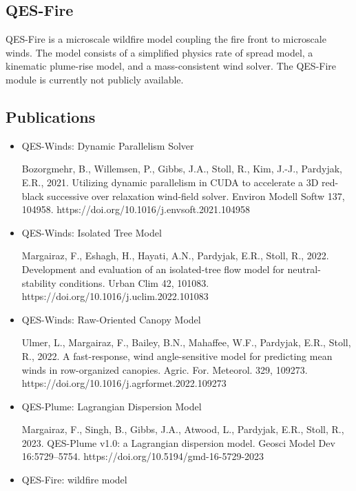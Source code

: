\subsection{QES-Fire}

QES-Fire is a microscale wildfire model coupling the fire front to microscale winds. The model consists of a simplified physics rate of spread model, a kinematic plume-rise model, and a mass-consistent wind solver. The QES-Fire module is currently not publicly available.


\subsection{Publications}

\begin{itemize}

\item QES-Winds: Dynamic Parallelism Solver

Bozorgmehr, B., Willemsen, P., Gibbs, J.A., Stoll, R., Kim, J.-J., Pardyjak, E.R., 2021. Utilizing dynamic parallelism in CUDA to accelerate a 3D red-black successive over relaxation wind-field solver. Environ Modell Softw 137, 104958. https://doi.org/10.1016/j.envsoft.2021.104958

\item QES-Winds: Isolated Tree Model

Margairaz, F., Eshagh, H., Hayati, A.N., Pardyjak, E.R., Stoll, R., 2022. Development and evaluation of an isolated-tree flow model for neutral-stability conditions. Urban Clim 42, 101083. https://doi.org/10.1016/j.uclim.2022.101083

\item QES-Winds: Raw-Oriented Canopy Model

Ulmer, L., Margairaz, F., Bailey, B.N., Mahaffee, W.F., Pardyjak, E.R., Stoll, R., 2022. A fast-response, wind angle-sensitive model for predicting mean winds in row-organized canopies. Agric. For. Meteorol. 329, 109273. https://doi.org/10.1016/j.agrformet.2022.109273

\item QES-Plume: Lagrangian Dispersion Model

Margairaz, F., Singh, B., Gibbs, J.A., Atwood, L., Pardyjak, E.R., Stoll, R., 2023. QES-Plume v1.0: a Lagrangian dispersion model. Geosci Model Dev 16:5729–5754. https://doi.org/10.5194/gmd-16-5729-2023

\item QES-Fire: wildfire model


\end{itemize}
